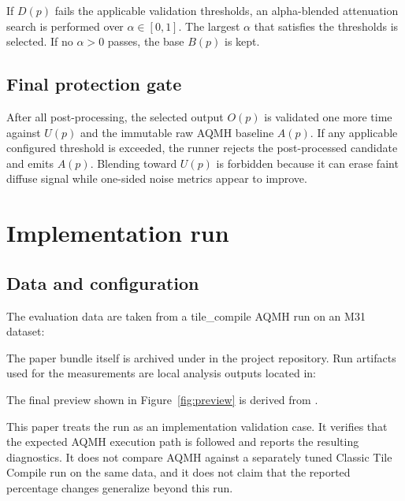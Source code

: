 \documentclass[10pt,twocolumn]{article}
\begin{document}
If $D(p)$ fails the applicable validation thresholds, an alpha-blended attenuation search is
performed over $\alpha \in [0, 1]$. The largest $\alpha$ that satisfies the thresholds is
selected. If no $\alpha > 0$ passes, the base $B(p)$ is kept.

\subsection{Final protection gate}

After all post-processing, the selected output $O(p)$ is validated one more time against $U(p)$
and the immutable raw AQMH baseline $A(p)$. If any applicable configured threshold is exceeded,
the runner rejects the post-processed candidate and emits $A(p)$. Blending toward $U(p)$ is
forbidden because it can erase faint diffuse signal while one-sided noise metrics appear to
improve.

\section{Implementation run}

\subsection{Data and configuration}

The evaluation data are taken from a tile\_compile AQMH run on an M31 dataset:
\begin{center}
\small
{}
\end{center}
The paper bundle itself is archived under
\href{https://github.com/jeamy/tile_compile/tree/master/docs/AQMH/zenodo-0.2.0}
{} in the project repository. Run artifacts used for
the measurements are local analysis outputs located in:
\begin{center}
\small
{}
\end{center}
The final preview shown in Figure~\ref{fig:preview} is derived from
.

This paper treats the run as an implementation validation case. It verifies that the expected AQMH
execution path is followed and reports the resulting diagnostics. It does not compare AQMH against
a separately tuned Classic Tile Compile run on the same data, and it does not claim that the
reported percentage changes generalize beyond this run.
\end{document}
